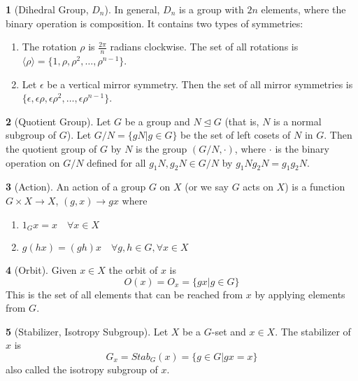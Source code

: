 \documentclass[12pt]{article}
\theoremstyle{definition}
\newtheorem{definition}{\color{NavyBlue}{\textbf{Definition}}}
\newcommand{\e}{\epsilon}
\begin{document}
\begin{definition}[Dihedral Group, $D_n$]
In general, $D_n$ is a group with $2n$ elements, where the binary operation is composition. It contains two types of symmetries:
\begin{enumerate}
\item The rotation $\rho$ is $\frac{2\pi}{n}$ radians clockwise. The set of all rotations is $\langle \rho \rangle = \{1, \rho, \rho^2, \ldots, \rho^{n-1} \}$.
\item Let $\e$ be a vertical mirror symmetry. Then the set of all mirror symmetries is $\{\e, \e\rho, \e\rho^2, \ldots, \e \rho^{n-1} \}$.
\end{enumerate}
\end{definition}

\begin{definition}[Quotient Group]
Let $G$ be a group and $N \trianglelefteq G$ (that is, $N$ is a normal subgroup of $G$). Let $G/N = \{gN|g \in G\}$ be the set of left cosets of $N$ in $G$. Then the quotient group of $G$ by $N$ is the group $(G/N, \cdot)$, where $\cdot$ is the binary operation on $G/N$ defined for all $g_1 N, g_2 N \in G / N$ by $g_1 N g_2 N = g_1g_2N$.
\end{definition}

\begin{definition}[Action]
An action of a group $G$ on $X$ (or we say $G$ acts on $X$) is a function $G \times X \to X$, $(g,x) \to gx$ where
\begin{enumerate}
\item $1_G x = x \quad \forall x \in X$
\item $g(hx) = (gh)x \quad \forall g,h \in G, \forall x \in X$
\end{enumerate}
\end{definition}

\begin{definition}[Orbit]
Given $x \in X$ the orbit of $x$ is
\begin{equation}
O(x) = O_x = \{gx | g \in G\}
\end{equation}
This is the set of all elements that can be reached from $x$ by applying elements from $G$.
\end{definition}

\begin{definition}[Stabilizer, Isotropy Subgroup]
Let $X$ be a $G$-set and $x \in X$. The stabilizer of $x$ is
\begin{equation}
G_x = Stab_G(x) = \{ g\in G | gx = x \}
\end{equation}
also called the isotropy subgroup of $x$.
\end{definition}
\end{document}
